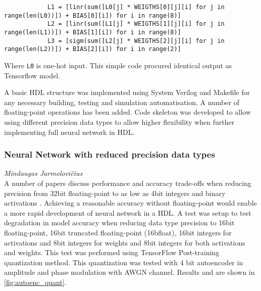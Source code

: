     	\begin{lstlisting}
    		L1 = [linr(sum([L0[j] * WEIGTHS[0][j][i] for j in range(len(L0))]) + BIAS[0][i]) for i in range(8)]
    		L2 = [linr(sum([L1[j] * WEIGTHS[1][j][i] for j in range(len(L1))]) + BIAS[1][i]) for i in range(8)]
    		L3 = [sigm(sum([L2[j] * WEIGTHS[2][j][i] for j in range(len(L2))]) + BIAS[2][i]) for i in range(2)]
    	\end{lstlisting}
    	Where \texttt{L0} is one-hot input. This simple code procured identical output as Tensorflow model. 
    	
    	A basic HDL structure was implemented using System Verilog and Makefile for any necessary building, testing and simulation automatisation. A number of floating-point operations has been added. Code skeleton was developed to allow using different precision data types to allow higher flexibility when further implementing full neural network in HDL.
    
    \subsubsection{Neural Network with reduced precision data types}
    \label{sec:reduced_precision_data_types}
    \hspace*{0pt}\hfill \textit{Mindaugas Jarmolovi\v{c}ius}\\
    
        A number of papers discuss performance and accuracy trade-offs when reducing precision from 32bit floating-point to as low as 4bit integers and binary activations \autocite{9039366,8280163,7929192,6927383,8702332,8330546}. Achieving a reasonable accuracy without floating-point would enable a more rapid development of neural network in a HDL. A test was setup to test degradation in model accuracy when reducing data type precision to 16bit floating-point, 16bit truncated floating-point (16bfloat), 16bit integers for activations and 8bit integers for weights and 8bit integers for both activations and weights. This test was performed using TensorFlow Post-training quantization method. This quantization was tested with 4 bit autoencoder in amplitude and phase modulation with AWGN channel. Results and  are shown in \autoref{fig:autoenc_quant}. 
        
